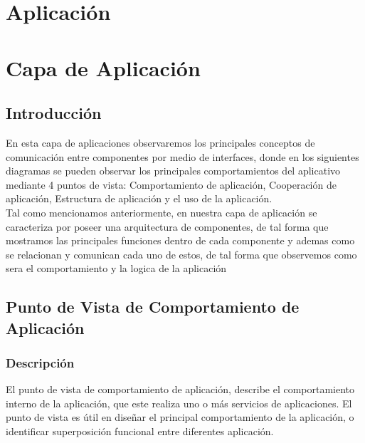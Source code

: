\chapter{Aplicación}

\chapter{Capa de Aplicación}

\section{Introducción}
En esta capa de aplicaciones observaremos los principales conceptos de comunicación entre componentes por medio de interfaces, donde en los siguientes diagramas se pueden observar los principales comportamientos del aplicativo mediante 4 puntos de vista: Comportamiento de aplicación, Cooperación de aplicación, Estructura de aplicación y el uso de la aplicación.\\
Tal como mencionamos anteriormente, en nuestra capa de aplicación se caracteriza por poseer una arquitectura de componentes, de tal forma que  mostramos las principales funciones dentro de cada componente y ademas como se relacionan y comunican cada uno de estos, de tal forma que observemos como sera el comportamiento y la logica de la aplicación

\section{Punto de Vista de Comportamiento de Aplicación}
\subsection{Descripción}
El punto de vista de comportamiento de aplicación, describe el comportamiento interno de la aplicación, que este realiza uno o más servicios de aplicaciones. El punto de vista es útil en diseñar el principal comportamiento de la aplicación, o identificar superposición funcional entre diferentes aplicación.

